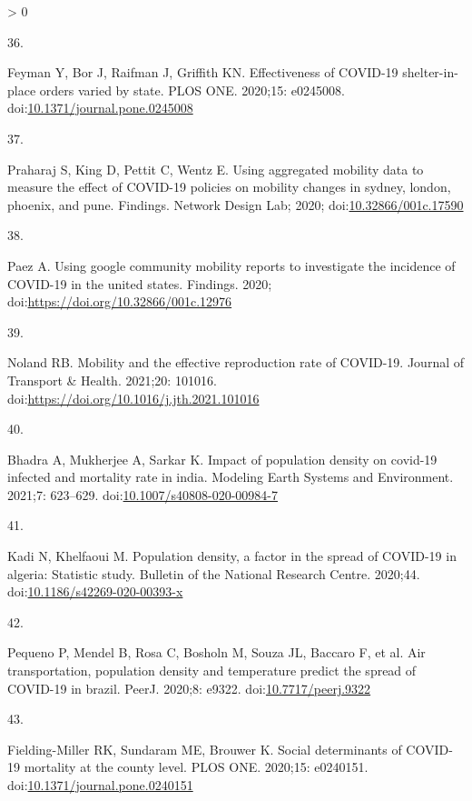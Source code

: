 \documentclass[10pt,letterpaper]{article}
\newlength{\csllabelwidth}
\newlength{\cslhangindent}
\newenvironment{CSLReferences}[3] %
 {%
  \setlength{\parindent}{0pt}
  \ifodd #1 \everypar{\setlength{\hangindent}{\cslhangindent}}\ignorespaces\fi
  \ifnum #2 > 0
  \setlength{\parskip}{#2\baselineskip}
  \fi
 }%
 {}
\newcommand{\CSLLeftMargin}[1]{\parbox[t]{\csllabelwidth}{#1}}
\newcommand{\CSLRightInline}[1]{\parbox[t]{\linewidth - \csllabelwidth}{#1}}
\begin{document}
\begin{CSLReferences}{0}{0}
\leavevmode\hypertarget{ref-Feyman2020effectiveness}{}%
\CSLLeftMargin{36. }
\CSLRightInline{Feyman Y, Bor J, Raifman J, Griffith KN. Effectiveness
of COVID-19 shelter-in-place orders varied by state. PLOS ONE. 2020;15:
e0245008.
doi:\href{https://doi.org/10.1371/journal.pone.0245008}{10.1371/journal.pone.0245008}}

\leavevmode\hypertarget{ref-Praharaj2020Using}{}%
\CSLLeftMargin{37. }
\CSLRightInline{Praharaj S, King D, Pettit C, Wentz E. Using aggregated
mobility data to measure the effect of COVID-19 policies on mobility
changes in sydney, london, phoenix, and pune. Findings. Network Design
Lab; 2020;
doi:\href{https://doi.org/10.32866/001c.17590}{10.32866/001c.17590}}

\leavevmode\hypertarget{ref-Paez2020using}{}%
\CSLLeftMargin{38. }
\CSLRightInline{Paez A. Using google community mobility reports to
investigate the incidence of COVID-19 in the united states. Findings.
2020; doi:\url{https://doi.org/10.32866/001c.12976}}

\leavevmode\hypertarget{ref-Noland2021mobility}{}%
\CSLLeftMargin{39. }
\CSLRightInline{Noland RB. Mobility and the effective reproduction rate
of COVID-19. Journal of Transport \& Health. 2021;20: 101016.
doi:\url{https://doi.org/10.1016/j.jth.2021.101016}}

\leavevmode\hypertarget{ref-Bhadra2021impact}{}%
\CSLLeftMargin{40. }
\CSLRightInline{Bhadra A, Mukherjee A, Sarkar K. Impact of population
density on covid-19 infected and mortality rate in india. Modeling Earth
Systems and Environment. 2021;7: 623--629.
doi:\href{https://doi.org/10.1007/s40808-020-00984-7}{10.1007/s40808-020-00984-7}}

\leavevmode\hypertarget{ref-Kadi2020population}{}%
\CSLLeftMargin{41. }
\CSLRightInline{Kadi N, Khelfaoui M. Population density, a factor in the
spread of COVID-19 in algeria: Statistic study. Bulletin of the National
Research Centre. 2020;44.
doi:\href{https://doi.org/10.1186/s42269-020-00393-x}{10.1186/s42269-020-00393-x}}

\leavevmode\hypertarget{ref-Pequeno2020air}{}%
\CSLLeftMargin{42. }
\CSLRightInline{Pequeno P, Mendel B, Rosa C, Bosholn M, Souza JL,
Baccaro F, et al. Air transportation, population density and temperature
predict the spread of COVID-19 in brazil. PeerJ. 2020;8: e9322.
doi:\href{https://doi.org/10.7717/peerj.9322}{10.7717/peerj.9322}}

\leavevmode\hypertarget{ref-Fielding2020social}{}%
\CSLLeftMargin{43. }
\CSLRightInline{Fielding-Miller RK, Sundaram ME, Brouwer K. Social
determinants of COVID-19 mortality at the county level. PLOS ONE.
2020;15: e0240151.
doi:\href{https://doi.org/10.1371/journal.pone.0240151}{10.1371/journal.pone.0240151}}


\end{CSLReferences}
\end{document}
